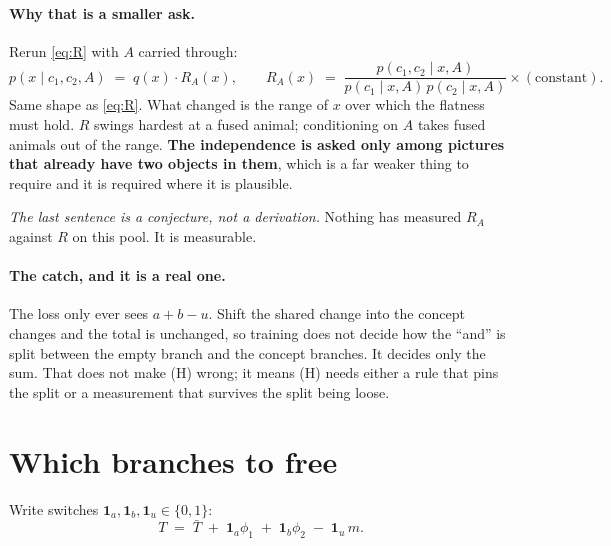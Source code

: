\documentclass[11pt]{article}
\begin{document}
\paragraph{Why that is a smaller ask.}
Rerun \eqref{eq:R} with $A$ carried through:
\begin{equation}
  p(x\mid c_1,c_2,A) \;=\; q(x)\cdot R_A(x),
  \qquad
  R_A(x) \;=\; \frac{p(c_1,c_2\mid x,A)}{p(c_1\mid x,A)\,p(c_2\mid x,A)}\times(\text{constant}).
  \label{eq:RA}
\end{equation}
Same shape as \eqref{eq:R}. What changed is the range of $x$ over which the flatness must hold.
$R$ swings hardest at a fused animal; conditioning on $A$ takes fused animals out of the range.
\textbf{The independence is asked only among pictures that already have two objects in them}, which
is a far weaker thing to require and it is required where it is plausible.

\emph{The last sentence is a conjecture, not a derivation.} Nothing has measured $R_A$ against $R$
on this pool. It is measurable.

\paragraph{The catch, and it is a real one.}
The loss only ever sees $a+b-u$. Shift the shared change into the concept changes and the total is
unchanged, so training does not decide how the ``and'' is split between the empty branch and the
concept branches. It decides only the sum. That does not make (H) wrong; it means (H) needs either
a rule that pins the split or a measurement that survives the split being loose.

\section{Which branches to free}
\label{sec:freeze}

Write switches $\mathbf{1}_a,\mathbf{1}_b,\mathbf{1}_u \in \{0,1\}$:
\begin{equation}
  T \;=\; \bar T \;+\; \mathbf{1}_a \phi_1 \;+\; \mathbf{1}_b \phi_2 \;-\; \mathbf{1}_u\, m .
  \label{eq:switches}
\end{equation}
\end{document}
